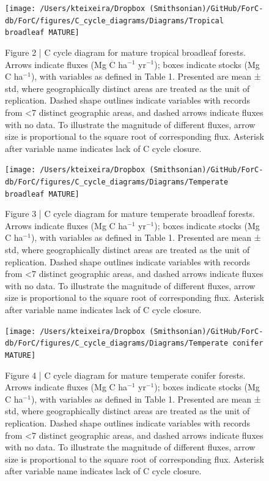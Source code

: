 \documentclass[
]{article}
\begin{document}
\begin{landscape}
\begin{figure}[H]

{\centering \texttt{[image: /Users/kteixeira/Dropbox (Smithsonian)/GitHub/ForC-db/ForC/figures/C\_cycle\_diagrams/Diagrams/Tropical broadleaf MATURE]} 

}

\caption{Figure 2 | C cycle diagram for mature tropical broadleaf forests. Arrows indicate fluxes (Mg C ha$^{-1}$ yr$^{-1}$); boxes indicate stocks (Mg C ha$^{-1}$), with variables as defined in Table 1. Presented are mean ± std, where geographically distinct areas are treated as the unit of replication. Dashed shape outlines indicate variables with records from <7 distinct geographic areas, and dashed arrows indicate fluxes with no data. To illustrate the magnitude of different fluxes, arrow size is proportional to the square root of corresponding flux. Asterisk after variable name indicates lack of C cycle closure.}\label{fig:unnamed-chunk-9}
\end{figure}

\begin{figure}[H]

{\centering \texttt{[image: /Users/kteixeira/Dropbox (Smithsonian)/GitHub/ForC-db/ForC/figures/C\_cycle\_diagrams/Diagrams/Temperate broadleaf MATURE]} 

}

\caption{Figure 3 | C cycle diagram for mature temperate broadleaf forests. Arrows indicate fluxes (Mg C ha$^{-1}$ yr$^{-1}$); boxes indicate stocks (Mg C ha$^{-1}$), with variables as defined in Table 1. Presented are mean ± std, where geographically distinct areas are treated as the unit of replication. Dashed shape outlines indicate variables with records from <7 distinct geographic areas, and dashed arrows indicate fluxes with no data. To illustrate the magnitude of different fluxes, arrow size is proportional to the square root of corresponding flux. Asterisk after variable name indicates lack of C cycle closure.}\label{fig:unnamed-chunk-10}
\end{figure}

\begin{figure}[H]

{\centering \texttt{[image: /Users/kteixeira/Dropbox (Smithsonian)/GitHub/ForC-db/ForC/figures/C\_cycle\_diagrams/Diagrams/Temperate conifer MATURE]} 

}

\caption{Figure 4 | C cycle diagram for mature temperate conifer forests. Arrows indicate fluxes (Mg C ha$^{-1}$ yr$^{-1}$); boxes indicate stocks (Mg C ha$^{-1}$), with variables as defined in Table 1. Presented are mean ± std, where geographically distinct areas are treated as the unit of replication. Dashed shape outlines indicate variables with records from <7 distinct geographic areas, and dashed arrows indicate fluxes with no data. To illustrate the magnitude of different fluxes, arrow size is proportional to the square root of corresponding flux. Asterisk after variable name indicates lack of C cycle closure.}\label{fig:unnamed-chunk-11}
\end{figure}


\end{landscape}
\end{document}

